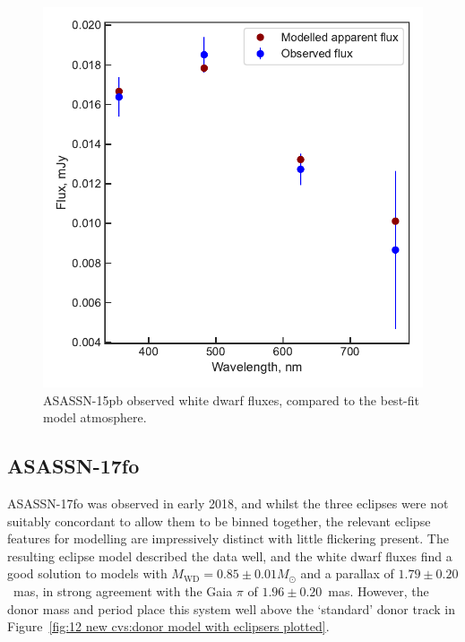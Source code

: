 \begin{figure}
    \centering
    \includegraphics[width=\textwidth]{figures/results/ASASSN-15pb/fluxplot.pdf}
    \caption{ASASSN-15pb observed white dwarf fluxes, compared to the best-fit model atmosphere.}
    \label{fig:ASASSN-15pb flux plot}
\end{figure}
\clearpage


\newpage
\subsection{ASASSN-17fo}

ASASSN-17fo was observed in early 2018, and whilst the three eclipses were not suitably concordant to allow them to be binned together, the relevant eclipse features for modelling are impressively distinct with little flickering present. The resulting eclipse model described the data well, and the white dwarf fluxes find a good solution to models with $M_\mathrm{WD} = 0.85\pm0.01 M_\odot$ and a parallax of $1.79\pm0.20$~mas, in strong agreement with the Gaia $\pi$ of $1.96 \pm 0.20$~mas. However, the donor mass and period place this system well above the `standard' \citet{knigge11} donor track in Figure~\ref{fig:12 new cvs:donor model with eclipsers plotted}.


%     

